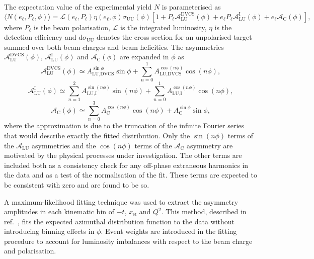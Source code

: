 \documentclass[11pt,a4paper]{article}
\begin{document}
The expectation value of the experimental yield $N$ is parameterised as
\begin{equation}
 \langle N(e_{\ell},P_{\ell},\phi)\rangle =
\mathcal{L}(e_{\ell},P_{\ell})\eta(e_{\ell},\phi)\sigma_{\textrm{UU}}
(\phi)
[1+P_{\ell}\mathcal{A}_{\textrm{LU}}^{\textrm{DVCS}}(\phi)+e_{\ell}P_{\ell}
\mathcal{A}_{\textrm{LU}}^{\textrm{I}}(\phi)+e_{\ell}\mathcal{A}_{\textrm{C}}
(\phi)],
\end{equation}
where $P_\ell$ is the beam polarisation, $\mathcal{L}$ is the integrated luminosity, $\eta$ is the detection
efficiency and d$\sigma_{\textrm{UU}}$ denotes the
cross section for an unpolarised target summed over both beam charges and
beam helicities. The asymmetries $\mathcal{A}_{\textrm{LU}}^{\textrm{DVCS}}(\phi)$, $\mathcal{A}_{\textrm{LU}}^{\textrm{I}}(\phi)$ and
$\mathcal{A}_{\textrm{C}}(\phi)$ are expanded in
$\phi$ as
\begin{equation}
 \mathcal{A}_{\textrm{LU}}^{\textrm{DVCS}}(\phi) \simeq 
A_{\textrm{LU,DVCS}}^{\sin\phi}\sin\phi 
+ \sum^{1}_{n=0} A_{\textrm{LU,DVCS}}^{\cos(n\phi)}\cos(n\phi), 
\label{aludvcs_asym}
\end{equation}
\begin{equation}
\mathcal{A}_{\textrm{LU}}^{\textrm{I}}(\phi) \simeq \sum^{2}_{n=1}
A_{\textrm{LU,I}}^{\sin(n\phi)}\sin(n\phi) 
+ \sum^{1}_{n=0} A_{\textrm{LU,I}}^{\cos(n\phi)}\cos(n\phi), 
\label{alui_asym}
\end{equation}
\begin{equation}
\mathcal{A}_{\textrm{C}}(\phi) \simeq \sum^{3}_{n=0}
A_{\textrm{C}}^{\cos(n\phi)}\cos(n\phi) 
+ A_{\textrm{C}}^{\sin\phi}\sin\phi,
\label{ac_asym}
\end{equation}
where the approximation is due to the truncation of the infinite
Fourier series that would describe exactly the fitted distribution. Only the $\sin(n\phi)$ terms of the
$\mathcal{A}_{\textrm{LU}}$ asymmetries and the $\cos(n\phi)$ terms of the
$\mathcal{A}_{\textrm{C}}$ asymmetry are motivated by the
  physical processes under investigation. The other terms
are included both as a consistency check for any off-phase
extraneous harmonics in the data and as a test of the
normalisation of the fit. These terms are expected to be
consistent with zero and are found to be so.

A maximum-likelihood fitting technique \cite{Bar90} was used to
extract the asymmetry amplitudes in each kinematic bin of $-t$, $x_{\textrm{B}}$ and $Q^{2}$.
This method, described in ref.~\cite{Air08}, fits the expected
azimuthal distribution function to the data without introducing binning effects in $\phi$.
Event weights are introduced in the fitting procedure to account for
luminosity imbalances with respect to the beam charge and polarisation.
\end{document}

